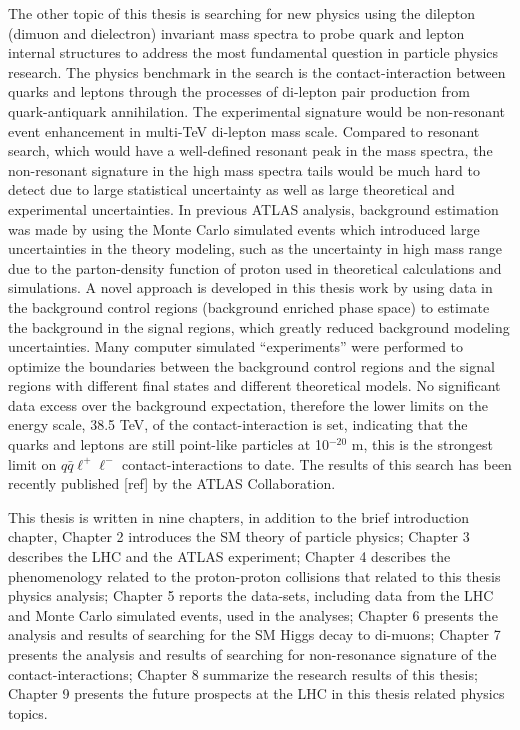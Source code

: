  The other topic of this thesis is searching for new physics using the dilepton (dimuon and dielectron) invariant mass spectra 
 to probe quark and lepton internal structures to address the most fundamental question in particle physics research. 
 The physics benchmark in the search is the contact-interaction between quarks and leptons through the processes of di-lepton pair production 
 from quark-antiquark annihilation. The experimental signature would be non-resonant event enhancement in multi-TeV di-lepton mass scale. 
 Compared to resonant search, which would have a well-defined resonant peak in the mass spectra, the non-resonant signature in the high mass spectra tails 
 would be much hard to detect due to large statistical uncertainty as well as large theoretical and experimental uncertainties. 
 In previous ATLAS analysis, background estimation was made by using the Monte Carlo simulated events which introduced large uncertainties 
 in the theory modeling, such as the uncertainty in high mass range due to the parton-density function of proton used in theoretical calculations and simulations.  
 A novel approach is developed in this thesis work
 by using data in the background control regions (background enriched phase space) to estimate the background in the signal regions, 
 which greatly reduced background modeling uncertainties. Many computer simulated “experiments” were performed to optimize the boundaries 
 between the background control regions and the signal regions with different final states and different theoretical models.
 No significant data excess over the background expectation, therefore the lower limits on the energy scale, 38.5 TeV, of the contact-interaction is set, 
 indicating that the quarks and leptons are still point-like particles at 10$^{-20}$ m, 
 this is the strongest limit on $q\bar q \ell^+\ell^-$ contact-interactions to date.
 The results of this search has been recently published [ref] by the ATLAS Collaboration.
 
This thesis is written in nine chapters, in addition to the brief introduction chapter,
Chapter 2 introduces the SM theory of particle physics;
Chapter 3 describes the LHC and the ATLAS experiment;
Chapter 4 describes the phenomenology related to the proton-proton collisions that related to this thesis physics analysis;
Chapter 5 reports the data-sets, including data from the LHC and Monte Carlo simulated events, used in the analyses;
Chapter 6 presents the analysis and results of searching for the SM Higgs decay to di-muons;
Chapter 7 presents the analysis and results of searching for non-resonance signature of the contact-interactions;
Chapter 8 summarize the research results of this thesis;
Chapter 9 presents the future prospects at the LHC in this thesis related physics topics.
 
